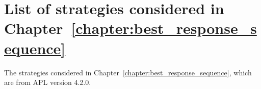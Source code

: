 \section{List of strategies considered in Chapter~\ref{chapter:best_response_sequence}}\label{app:list_of_players_06}

The strategies considered in Chapter~\ref{chapter:best_response_sequence},
which are from APL version 4.2.0.

\begin{multicols}{3}
	\begin{enumerate}
		
	\end{enumerate}
\end{multicols}